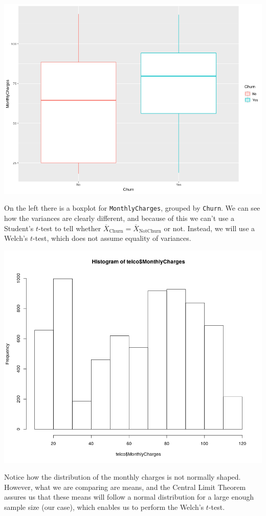 \documentclass[man, floatsintext]{apa6}
\begin{document}
\noindent\begin{minipage}{0.54\textwidth}
\includegraphics[width = \linewidth]{boxplot_MonthlyChargesvsChurn}
\end{minipage}
\hfill
\begin{minipage}{0.45\textwidth} On the left there is a boxplot for \texttt{MonthlyCharges}, grouped by \texttt{Churn}. We can see how the variances are clearly different, and because of this we can't use a Student's $t$-test to tell whether $\overline{X}_{\text{Churn}} = \overline{X}_{\text{NotChurn}}$ or not. Instead, we will use a Welch's $t$-test, which does not assume equality of variances.
 
\end{minipage}
\noindent\begin{minipage}{0.5\textwidth}
\includegraphics[width = \linewidth]{hist_MonthlyCharges}
\end{minipage}
\hfill
\begin{minipage}{0.45\textwidth} Notice how the distribution of the monthly charges is not normally shaped. However, what we are comparing are means, and the Central Limit Theorem assures us that these means will follow a normal distribution for a large enough sample size (our case), which enables us to perform the Welch's $t$-test. 
\end{minipage}
\end{document}
